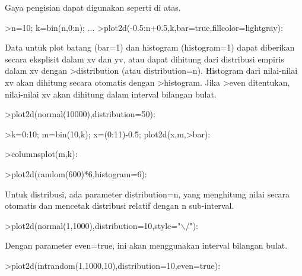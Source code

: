\documentclass[a4paper,10pt]{article}
\begin{document}
\begin{eulernotebook}
\begin{eulercomment}
\begin{eulercomment}
\begin{eulercomment}
\begin{eulercomment}
\begin{eulercomment}
\begin{eulercomment}
\begin{eulercomment}
Gaya pengisian dapat digunakan seperti di atas.
\end{eulercomment}
\begin{eulerprompt}
>n=10; k=bin(n,0:n); ...
>plot2d(-0.5:n+0.5,k,bar=true,fillcolor=lightgray):
\end{eulerprompt}
\begin{eulercomment}
Data untuk plot batang (bar=1) dan histogram (histogram=1) dapat
diberikan secara eksplisit dalam xv dan yv, atau dapat dihitung dari
distribusi empiris dalam xv dengan \textgreater{}distribution (atau
distribution=n). Histogram dari nilai-nilai xv akan dihitung secara
otomatis dengan \textgreater{}histogram. Jika \textgreater{}even ditentukan, nilai-nilai xv akan
dihitung dalam interval bilangan bulat.
\end{eulercomment}
\begin{eulerprompt}
>plot2d(normal(10000),distribution=50):
\end{eulerprompt}
\begin{eulerprompt}
>k=0:10; m=bin(10,k); x=(0:11)-0.5; plot2d(x,m,>bar):
\end{eulerprompt}
\begin{eulerprompt}
>columnsplot(m,k):
\end{eulerprompt}
\begin{eulerprompt}
>plot2d(random(600)*6,histogram=6):
\end{eulerprompt}
\begin{eulercomment}
Untuk distribusi, ada parameter distribution=n, yang menghitung nilai
secara otomatis dan mencetak distribusi relatif dengan n sub-interval.
\end{eulercomment}
\begin{eulerprompt}
>plot2d(normal(1,1000),distribution=10,style="\(\backslash\)/"):
\end{eulerprompt}
\begin{eulercomment}
Dengan parameter even=true, ini akan menggunakan interval bilangan
bulat.
\end{eulercomment}
\begin{eulerprompt}
>plot2d(intrandom(1,1000,10),distribution=10,even=true):

\end{eulerprompt}
\end{eulercomment}
\end{eulercomment}
\end{eulercomment}
\end{eulercomment}
\end{eulercomment}
\end{eulercomment}
\end{eulernotebook}
\end{document}
